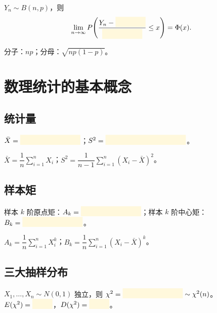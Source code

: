 \documentclass[11pt,a4paper]{article}
\newcommand{\blankbox}[1]{%
  \textcolor{blankyellow}{\rule[-0.1cm]{#1}{0.5cm}}%
}
\begin{document}
\begin{formulabox}
$Y_n\sim B(n,p)$，则
\[\lim_{n\to\infty} P\!\left(\frac{Y_n - \blankbox{1.5cm}}{\blankbox{2cm}} \leq x\right) = \Phi(x).\]
\end{formulabox}

\begin{answerbox}
分子：$np$；分母：$\sqrt{np(1-p)}$。
\end{answerbox}

\section{数理统计的基本概念}

\subsection{统计量}

\begin{formulabox}[样本均值与样本方差]
$\bar X = \blankbox{3cm}$；$S^2 = \blankbox{4cm}$。
\end{formulabox}

\begin{answerbox}
$\bar X=\dfrac{1}{n}\displaystyle\sum_{i=1}^n X_i$；$S^2=\dfrac{1}{n-1}\displaystyle\sum_{i=1}^n (X_i-\bar X)^2$。
\end{answerbox}

\subsection{样本矩}

\begin{formulabox}[样本矩]
样本 $k$ 阶原点矩：$A_k=\blankbox{3cm}$；样本 $k$ 阶中心矩：$B_k=\blankbox{3cm}$。
\end{formulabox}

\begin{answerbox}
$A_k=\dfrac{1}{n}\displaystyle\sum_{i=1}^n X_i^k$；$B_k=\dfrac{1}{n}\displaystyle\sum_{i=1}^n (X_i-\bar X)^k$。
\end{answerbox}

\subsection{三大抽样分布}

\begin{formulabox}[$\chi^2$ 分布]
$X_1,\dots,X_n\sim N(0,1)$ 独立，则 $\chi^2=\blankbox{3cm}\sim\chi^2(n)$。
$E(\chi^2)=\blankbox{1cm}$，$D(\chi^2)=\blankbox{1cm}$。
\end{formulabox}
\end{document}
